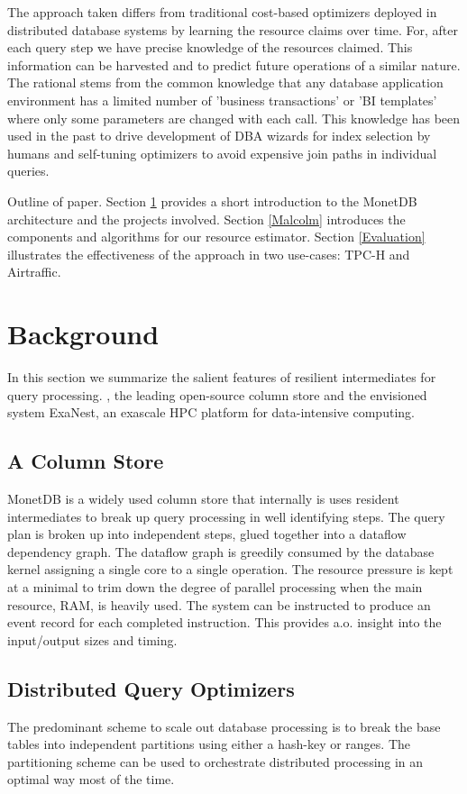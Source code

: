 \documentclass[conference]{IEEEtran}
\begin{document}
The approach taken differs from traditional cost-based optimizers deployed in distributed database systems by learning the resource claims over time. For, after each query step we have precise knowledge of the resources claimed. This information can be harvested and to predict future operations of a similar nature. The rational stems from the common knowledge that any database application environment has a limited number of 'business transactions' or 'BI templates' where only some parameters are changed with each call. This knowledge has been used in the past to drive development of DBA wizards \cite{microsoft} for index selection by humans and self-tuning optimizers \cite{IBM} to avoid expensive join paths in individual queries.

Outline of paper. Section \ref{Background} provides a short introduction to the MonetDB architecture and the projects involved. Section \ref{Malcolm} introduces the components
and algorithms for our resource estimator.
Section \ref{Evaluation} illustrates the effectiveness of the approach in two use-cases: TPC-H and Airtraffic.

\section{Background}
\label{Background} 
In this section we summarize the salient features of resilient intermediates for query processing.
, the leading open-source  column store and the envisioned system ExaNest, an exascale HPC platform for data-intensive computing.

\subsection{A Column Store}
MonetDB is a widely used column store that internally is uses resident intermediates to break up query processing in well identifying steps. 
The query plan is broken up into independent steps, glued together into a dataflow dependency graph.  The dataflow graph is greedily consumed by the database kernel assigning a single core to a single operation. The resource pressure is kept at a minimal to trim down the degree  of parallel processing when the main resource, RAM, is heavily used.
The system can be instructed to produce an event record for each completed instruction. This provides a.o. insight into the input/output sizes and timing. 

\subsection{Distributed Query Optimizers}
The predominant scheme to scale out database processing is to break the base tables into independent partitions using either a hash-key or ranges. The partitioning scheme can be used to orchestrate distributed processing in an optimal way most of the time.
\end{document}
